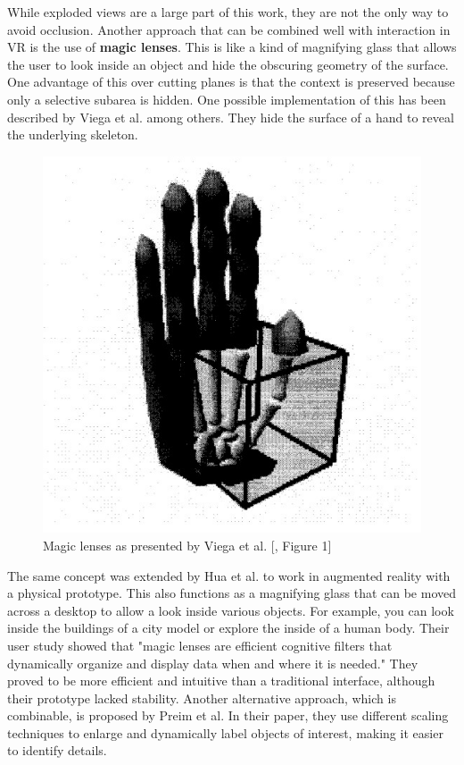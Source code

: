While exploded views are a large part of this work, they are not the only way to avoid occlusion. 
Another approach that can be combined well with interaction in VR is the use of \textbf{magic lenses}.
This is like a kind of magnifying glass that allows the user to look inside an object and hide the obscuring geometry of the surface.
One advantage of this over cutting planes is that the context is preserved because only a selective subarea is hidden.   
One possible implementation of this has been described by Viega et al. among others.\cite{Viega_1996}
They hide the surface of a hand to reveal the underlying skeleton.
\begin{figure}
	\centering
	\vspace{-0.4cm}
	\includegraphics[width=1\linewidth]{fig/Images/Viega_fig1}
	\caption[]{Magic lenses as presented by Viega et al. [\cite{Viega_1996}, Figure 1]}
	\vspace{-0.1cm}
\end{figure}
The same concept was extended by Hua et al. to work in augmented reality with a physical prototype.\cite{Hua_2006}
This also functions as a magnifying glass that can be moved across a desktop to allow a look inside various objects.
For example, you can look inside the buildings of a city model or explore the inside of a human body.
Their user study showed that "magic lenses are efficient cognitive filters that dynamically organize and display data when and where it is needed."\cite{Hua_2006}
They proved to be more efficient and intuitive than a traditional interface, although their prototype lacked stability.
Another alternative approach, which is combinable, is proposed by Preim et al. In their paper, they use different scaling techniques to enlarge and dynamically label objects of interest, making it easier to identify details.\cite{Preim_1997}

